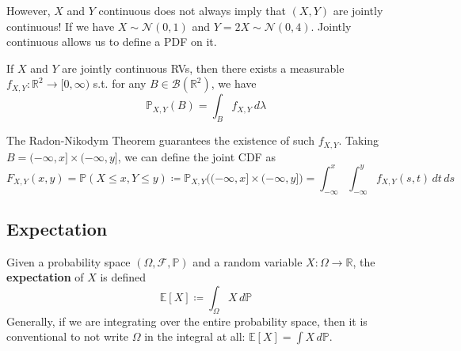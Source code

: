     However, $X$ and $Y$ continuous does not always imply that $(X, Y)$ are jointly continuous! If we have $X \sim \mathcal{N}(0, 1)$ and $Y = 2 X \sim \mathcal{N}(0, 4)$. Jointly continuous allows us to define a PDF on it. 

    \begin{theorem}
      If $X$ and $Y$ are jointly continuous RVs, then there exists a measurable $f_{X, Y} : \mathbb{R}^2 \longrightarrow [0, \infty)$ s.t. for any $B \in \mathcal{B}(\mathbb{R}^2)$, we have 
      \begin{equation}
        \mathbb{P}_{X, Y} (B) = \int_B f_{X, Y} \, d\lambda
      \end{equation}
    \end{theorem}

    The Radon-Nikodym Theorem guarantees the existence of such $f_{X, Y}$. Taking $B = (-\infty, x] \times (-\infty, y]$, we can define the joint CDF as 
    \begin{equation}
      F_{X, Y} (x, y) = \mathbb{P}(X \leq x, Y \leq y) \coloneqq \mathbb{P}_{X, Y} \big( (-\infty, x] \times (-\infty, y] \bigg) = \int_{-\infty}^x \int_{-\infty}^y f_{X, Y} (s, t) \, dt \,ds
    \end{equation}

\subsection{Expectation}

  \begin{definition}[Expectation]
    Given a probability space $(\Omega, \mathcal{F}, \mathbb{P})$ and a random variable $X: \Omega \longrightarrow \mathbb{R}$, the \textbf{expectation} of $X$ is defined 
    \begin{equation}
      \mathbb{E}[X] \coloneqq \int_\Omega X \, d\mathbb{P}
    \end{equation}
    Generally, if we are integrating over the entire probability space, then it is conventional to not write $\Omega$ in the integral at all: $\mathbb{E}[X] = \int X \,d\mathbb{P}$. 
  \end{definition}

